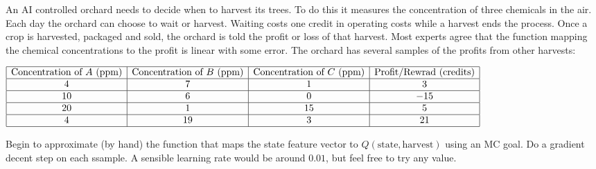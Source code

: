 
\begin{exercise}

An AI controlled orchard needs to decide when to harvest its trees.
To do this it measures the concentration of three chemicals in the air.
Each day the orchard can choose to wait or harvest.
Waiting costs one credit in operating costs while a harvest ends the process.
Once a crop is harvested, packaged and sold, the orchard is told the profit or loss of that harvest.
Most experts agree that the function mapping the chemical concentrations to the profit is linear with some error.
The orchard has several samples of the profits from other harvests:

\phantom{}

\resizebox{\textwidth}{!}
{
    \begin{math}
        \begin{aligned}
            \begin{array}{|c|c|c|c|}
                \hline
                \text{Concentration of}~ A ~\text{(ppm)} &
                \text{Concentration of}~ B ~\text{(ppm)} &
                \text{Concentration of}~ C ~\text{(ppm)} &
                \text{Profit/Rewrad (credits)} \\ \hline
                4  & 7  & 1  & 3   \\ \hline
                10 & 6  & 0  & -15 \\ \hline
                20 & 1  & 15 & 5   \\ \hline
                4  & 19 & 3  & 21  \\ \hline
            \end{array}
        \end{aligned}
    \end{math}
}

\phantom{}

Begin to approximate (by hand) the function that maps the state feature vector to $Q(\text{state}, \text{harvest})$ using an MC goal.
Do a gradient decent step on each ssample.
A sensible learning rate would be around $0.01$, but feel free to try any value.

\end{exercise}


\begin{solution}

\phantom{}

\end{solution}

